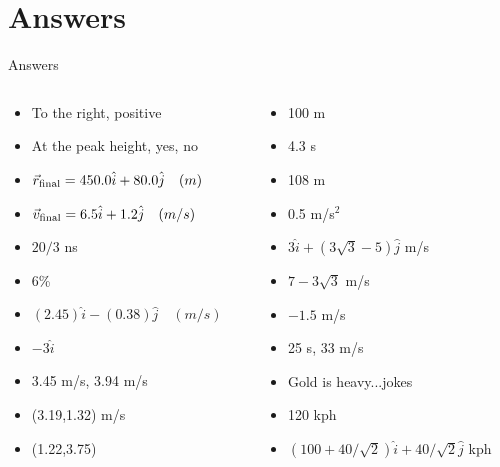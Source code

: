 \documentclass{beamer}
\begin{document}
\section{Answers}

\begin{frame}{Answers}
\begin{columns}[T]
\begin{column}{0.5\textwidth}
\begin{itemize}
\item To the right, positive
\item At the peak height, yes, no
\item $\vec{r}_{\rm final} = 450.0 \hat{i} + 80.0\hat{j}\quad (m)$
\item $\vec{v}_{\rm final} = 6.5 \hat{i} + 1.2\hat{j}\quad (m/s)$
\item $20/3$ ns
\item 6\%
\item $(2.45)\hat{i}-(0.38)\hat{j} \quad (m/s)$
\item $-3\hat{i}$
\item 3.45 m/s, 3.94 m/s
\item (3.19,1.32) m/s
\item (1.22,3.75)
\end{itemize}
\end{column}
\begin{column}{0.5\textwidth}
\begin{itemize}
\item 100 m
\item 4.3 s
\item 108 m
\item 0.5 m/s$^2$ 
\item $3\hat{i} + (3\sqrt{3}-5)\hat{j}$ m/s
\item $7-3\sqrt{3}$ m/s
\item $-1.5$ m/s
\item 25 s, 33 m/s
\item Gold is heavy...jokes
\item 120 kph
\item $(100+40/\sqrt{2})\hat{i} + 40/\sqrt{2}\hat{j}$  kph
\end{itemize}
\end{column}
\end{columns}
\end{frame}
\end{document}
